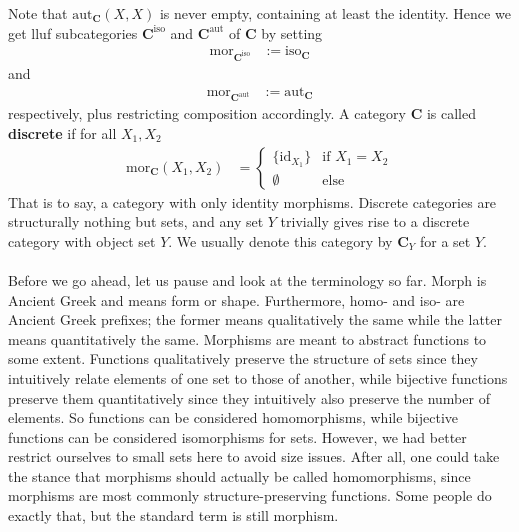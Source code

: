 Note that $\mathrm{aut}_{\mathbf{C}}(X,X)$ is never empty, containing at least the identity.
Hence we get lluf subcategories $\mathbf{C}^{\mathrm{iso}}$ and $\mathbf{C}^{\mathrm{aut}}$ of $\mathbf{C}$ by setting
\begin{align*}
  \mathrm{mor}_{\mathbf{C}^{\mathrm{iso}}}
  &:=
  \mathrm{iso}_{\mathbf{C}}
\end{align*}
and
\begin{align*}
  \mathrm{mor}_{\mathbf{C}^{\mathrm{aut}}}
  &:=
  \mathrm{aut}_{\mathbf{C}}
\end{align*}
respectively, plus restricting composition accordingly.
A category $\mathbf{C}$ is called \textbf{discrete} if for all $X_{1},X_{2}$
\begin{align*}
  \mathrm{mor}_{\mathbf{C}}(X_{1},X_{2})
  &=
  \begin{cases}
    \lbrace
      \mathrm{id}_{X_{1}}
    \rbrace
    &
    \text{if }
    X_{1}
    =
    X_{2}
    \\
    \emptyset
    &
    \text{else}
  \end{cases}
\end{align*}
That is to say, a category with only identity morphisms.
Discrete categories are structurally nothing but sets, and any set $Y$ trivially gives rise to a discrete category with object set $Y$.
We usually denote this category by $\mathbf{C}_{Y}$ for a set $Y$.
\\\\
Before we go ahead, let us pause and look at the terminology so far.
{\glqq}Morph{\grqq} is Ancient Greek and means {\glqq}form{\grqq} or {\glqq}shape{\grqq}.
Furthermore, {\glqq}homo-{\grqq} and {\glqq}iso-{\grqq} are Ancient Greek prefixes; the former means {\glqq}qualitatively the same{\grqq} while the latter means {\glqq}quantitatively the same{\grqq}.
Morphisms are meant to abstract functions to some extent.
Functions qualitatively preserve the structure of sets since they intuitively relate elements of one set to those of another, while bijective functions preserve them quantitatively since they intuitively also preserve the {\glqq}number{\grqq} of elements.
So functions can be considered homomorphisms, while bijective functions can be considered isomorphisms for sets.
However, we had better restrict ourselves to small sets here to avoid size issues.
After all, one could take the stance that morphisms should actually be called homomorphisms, since morphisms are most commonly structure-preserving functions.
Some people do exactly that, but the standard term is still morphism.
